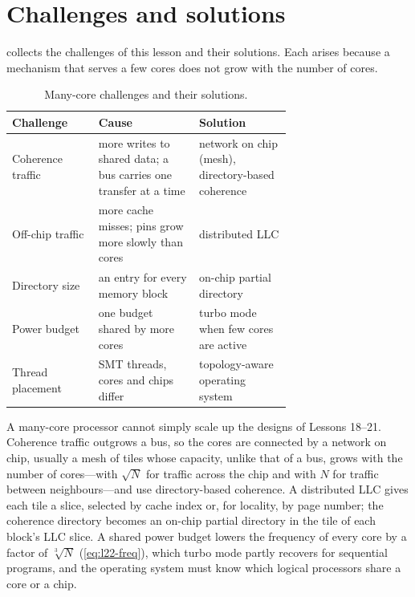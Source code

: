\documentclass[../main.tex]{subfiles}
\begin{document}
\section{Challenges and solutions}
\label{sec:l22-summary}

 collects the challenges of this lesson and their
solutions.  Each arises because a
mechanism that serves a few cores does not grow with the number of cores.

\begin{table}[htbp]
  \centering\small
  \caption{Many-core challenges and their solutions.}
  \label{tab:l22-challenges}
  \begin{tabular}{@{}l>{\raggedright\arraybackslash}p{0.36\linewidth}>{\raggedright\arraybackslash}p{0.33\linewidth}@{}}
    \toprule
    Challenge & Cause & Solution \\
    \midrule
    Coherence traffic & more writes to shared data; a bus carries one
      transfer at a time & network on chip (mesh), directory-based coherence \\
    Off-chip traffic & more cache misses; pins grow more slowly than cores
      & distributed LLC \\
    Directory size & an entry for every memory block & on-chip partial
      directory \\
    Power budget & one budget shared by more cores & turbo mode when few
      cores are active \\
    Thread placement & SMT threads, cores and chips differ &
      topology-aware operating system \\
    \bottomrule
  \end{tabular}
\end{table}

\begin{keypoint}
  A many-core processor cannot simply scale up the designs of Lessons
  18--21.  Coherence traffic outgrows a bus, so the cores are connected by a
  network on chip, usually a mesh of tiles whose capacity, unlike that of a
  bus, grows with the number of cores---with $\sqrt{N}$ for traffic across
  the chip and with $N$ for traffic between neighbours---and use
  directory-based coherence.  A distributed LLC gives each tile a slice,
  selected by cache index or, for locality, by page number; the coherence
  directory becomes an on-chip partial directory in the tile of each block's
  LLC slice.  A shared power budget lowers the frequency of every core by a
  factor of $\sqrt[3]{N}$ (\cref{eq:l22-freq}), which turbo mode partly
  recovers for sequential programs, and the operating system must know which
  logical processors share a core or a chip.
\end{keypoint}
\end{document}
